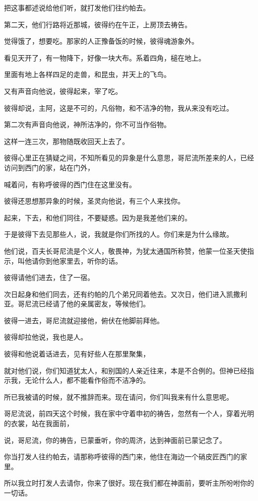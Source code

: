 \documentclass[12pt,oneside]{book}
\begin{document}
把这事都述说给他们听，就打发他们往约帕去。

第二天，他们行路将近那城，彼得约在午正，上房顶去祷告。

觉得饿了，想要吃。那家的人正豫备饭的时候，彼得魂游象外。

看见天开了，有一物降下，好像一块大布。系着四角，槌在地上。

里面有地上各样四足的走兽，和昆虫，并天上的飞鸟。

又有声音向他说，彼得起来，宰了吃。

彼得却说，主阿，这是不可的，凡俗物，和不洁净的物，我从来没有吃过。

第二次有声音向他说，神所洁净的，你不可当作俗物。

这样一连三次，那物随既收回天上去了。

彼得心里正在猜疑之间，不知所看见的异象是什么意思，哥尼流所差来的人，已经访问到西门的家，站在门外，

喊着问，有称呼彼得的西门住在这里没有。

彼得还思想那异象的时候，圣灵向他说，有三个人来找你。

起来，下去，和他们同往，不要疑惑。因为是我差他们来的。

于是彼得下去见那些人，说，我就是你们所找的人。你们来是为什么缘故。

他们说，百夫长哥尼流是个义人，敬畏神，为犹太通国所称赞，他蒙一位圣天使指示，叫他请你到他家里去，听你的话。

彼得请他们进去，住了一宿。

次日起身和他们同去，还有约帕的几个弟兄同着他去。又次日，他们进入凯撒利亚。哥尼流已经请了他的亲属密友，等候他们。

彼得一进去，哥尼流就迎接他，俯伏在他脚前拜他。

彼得却拉他说，我也是人。

彼得和他说着话进去，见有好些人在那里聚集，

就对他们说，你们知道犹太人，和别国的人亲近往来，本是不合例的。但神已经指示我，无论什么人，都不能看作俗而不洁净的。

所已我被请的时候，就不推辞而来。现在请问，你们叫我来有什么意思呢。

哥尼流说，前四天这个时候，我在家中守着申初的祷告，忽然有一个人，穿着光明的衣裳，站在我面前，

说，哥尼流，你的祷告，已蒙垂听，你的周济，达到神面前已蒙记念了。

你当打发人往约帕去，请那称呼彼得的西门来，他住在海边一个硝皮匠西门的家里。

所以我立时打发人去请你，你来了很好。现在我们都在神面前，要听主所吩咐你的一切话。
\end{document}
